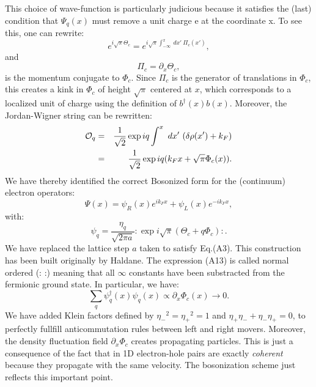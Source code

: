 This choice of wave-function is particularly judicious because
it satisfies the (last) condition that $\Psi_q(x)$ must 
remove a unit charge e at the coordinate x. To see this, one can rewrite:
\begin{equation}
e^{i\sqrt{\pi}\Theta_c}=e^{i\sqrt{\pi}\int_{-\infty}^{x}\ dx'\ 
\Pi_c(x')},
\end{equation}
and 
\begin{equation}
\Pi_c=\partial_x\Theta_c,
\end{equation}
is the momentum conjugate to $\Phi_c$. Since
$\Pi_c$ 
is the generator of translations in $\Phi_c$, this creates a kink in 
$\Phi_c$ of height 
$\sqrt{\pi}$ centered at $x$, which corresponds to a localized
unit of charge using the definition of $b^{\dag}(x)b(x)$.
Moreover, the Jordan-Wigner string can be rewritten:
\begin{eqnarray}
{\cal O}_q&=&\frac{1}{\sqrt{2}}\exp iq\int^x\ dx'\ (\delta\rho(x')+k_F)\\
\nonumber
&=&\frac{1}{\sqrt{2}}\exp iq(k_Fx+\sqrt{\pi}\Phi_c(x)).
\end{eqnarray}
We have thereby identified the correct Bosonized form for the
(continuum) electron operators:
\begin{equation}
\Psi(x)=\psi_{R}(x)e^{ik_F x}+\psi_{L}(x)e^{-ik_F x},
\end{equation}
with:
\begin{equation}
\psi_q=\frac{\eta_q}{\sqrt{{2}\pi a}}:\exp i\sqrt{\pi}(\Theta_c+q\Phi_c):.
\end{equation}
We have replaced the lattice step $a$ taken to satisfy Eq.(A3).
This construction has been built originally by Haldane. The expression
(A13) is called
normal ordered (: :) meaning that all $\infty$ constants have been
substracted from the fermionic ground state. In particular, we have:
\begin{equation}
\sum_q \psi_q^{\dag}(x)\psi_q(x)\propto\partial_x\Phi_c(x)\rightarrow 0.
\end{equation} 
We have added Klein factors defined by ${\eta_-}^2={\eta_+}^2=1$ and
${\eta_+}{\eta_-}+{\eta_-}{\eta_+}=0$, to perfectly
fullfill anticommutation rules between left and right movers.
Moreover, the density fluctuation field
$\partial_x\Phi_c$ creates propagating particles. This is
just a consequence of the fact
that in 1D electron-hole pairs are exactly {\it coherent} because they
propagate with the same velocity. The bosonization scheme just reflects
this important point.

